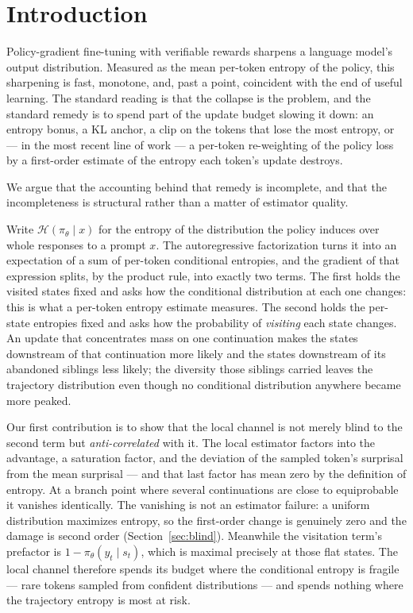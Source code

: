 \documentclass[11pt]{article}
\newcommand{\Htraj}{\mathcal{H}}
\newcommand{\pit}{\pi_{\theta}}
\begin{document}
\section{Introduction}
\label{sec:intro}

Policy-gradient fine-tuning with verifiable rewards sharpens a language model's
output distribution. Measured as the mean per-token entropy of the policy, this
sharpening is fast, monotone, and, past a point, coincident with the end of useful
learning. The standard reading is that the collapse is the problem, and the standard
remedy is to spend part of the update budget slowing it down: an entropy bonus, a KL
anchor, a clip on the tokens that lose the most entropy, or --- in the most recent
line of work --- a per-token re-weighting of the policy loss by a first-order
estimate of the entropy each token's update destroys.

We argue that the accounting behind that remedy is incomplete, and that the
incompleteness is structural rather than a matter of estimator quality.

Write $\Htraj(\pit \mid x)$ for the entropy of the distribution the policy induces
over whole responses to a prompt $x$. The autoregressive factorization turns it into
an expectation of a sum of per-token conditional entropies, and the gradient of that
expression splits, by the product rule, into exactly two terms. The first holds the
visited states fixed and asks how the conditional distribution at each one changes:
this is what a per-token entropy estimate measures. The second holds the per-state
entropies fixed and asks how the probability of \emph{visiting} each state changes.
An update that concentrates mass on one continuation makes the states downstream of
that continuation more likely and the states downstream of its abandoned siblings
less likely; the diversity those siblings carried leaves the trajectory distribution
even though no conditional distribution anywhere became more peaked.

Our first contribution is to show that the local channel is not merely blind to the
second term but \emph{anti-correlated} with it. The local estimator factors into the
advantage, a saturation factor, and the deviation of the sampled token's surprisal
from the mean surprisal --- and that last factor has mean zero by the definition of
entropy. At a branch point where several continuations are close to equiprobable it
vanishes identically. The vanishing is not an estimator failure: a uniform
distribution maximizes entropy, so the first-order change is genuinely zero and the
damage is second order (Section~\ref{sec:blind}). Meanwhile the visitation term's
prefactor is $1-\pit(y_t \mid s_t)$, which is maximal precisely at those flat
states. The local channel therefore spends its budget where the conditional entropy
is fragile --- rare tokens sampled from confident distributions --- and spends
nothing where the trajectory entropy is most at risk.
\end{document}
